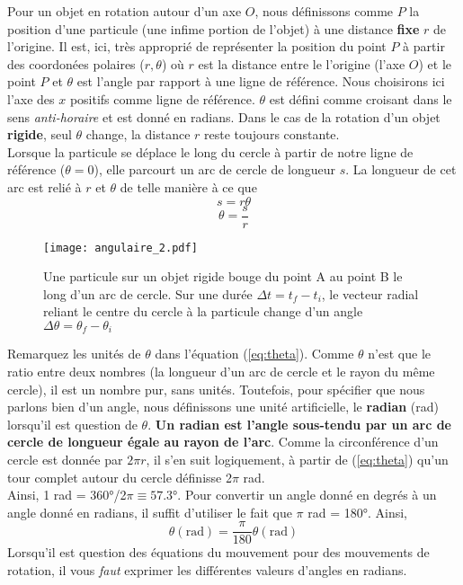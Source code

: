 \documentclass[titlepage,oneside,a4paper,11pt]{book} %
\begin{document}
Pour un objet en rotation autour d'un axe $O$, nous définissons comme $P$ la position d'une particule (une infime portion de l'objet) à une distance \textbf{fixe} $r$ de l'origine. Il est, ici, très approprié de représenter la position du point $P$ à partir des coordonées polaires ($r,\theta$) où $r$ est la distance entre le l'origine (l'axe $O$) et le point $P$ et $\theta$ est l'angle par rapport à une ligne de référence. Nous choisirons ici l'axe des $x$ positifs comme ligne de référence. $\theta$ est défini comme croisant dans le sens \emph{anti-horaire} et est donné en radians. Dans le cas de la rotation d'un objet \textbf{rigide}, seul {}$\theta$ change, la distance $r$ reste toujours constante.\\

Lorsque la particule se déplace le long du cercle à partir de notre ligne de référence ($\theta = 0$), elle parcourt un arc de cercle de longueur $s$. La longueur de cet arc est relié à $r$ et $\theta$ de telle manière à ce que
\begin{equation}
s=r\theta
\end{equation}
\begin{equation}
\theta=\frac{s}{r}
\label{eq:theta}
\end{equation}
\begin{wrapfigure}{r}{0.4\textwidth}
  \begin{center}
    \texttt{[image: angulaire\_2.pdf]}
  \end{center}
  \caption{Une particule sur un objet rigide bouge du point A au point B le long d'un arc de cercle. Sur une durée $\Delta t = t_f-t_i$, le vecteur radial reliant le centre du cercle à la particule change d'un angle $\Delta \theta = \theta_f-\theta_i$}
\end{wrapfigure}
Remarquez les unités de $\theta$ dans l'équation (\ref{eq:theta}). Comme $\theta$ n'est que le ratio entre deux nombres (la longueur d'un arc de cercle et le rayon du même cercle), il est un nombre pur, sans unités.  Toutefois, pour spécifier que nous parlons bien d'un angle, nous définissons une unité artificielle, le \textbf{radian} (rad) lorsqu'il est question de $\theta$. \textbf{Un radian est l'angle sous-tendu par un arc de cercle de longueur égale au rayon de l'arc}. Comme la circonférence d'un cercle est donnée par $2\pi r$, il s'en suit logiquement, à partir de (\ref{eq:theta}) qu'un tour complet autour du cercle définisse 2$\pi$ rad.\\

Ainsi, 1 rad = 360°/2$\pi \equiv 57.3$°. Pour convertir un angle donné en degrés à un angle donné en radians, il suffit d'utiliser le fait que $\pi$ rad = 180°. Ainsi,
\begin{equation*}
\theta (\mathrm{rad}) = \frac{\pi}{180}\theta(\mathrm{rad})
\end{equation*}
Lorsqu'il est question des équations du mouvement pour des mouvements de rotation, il vous \emph{faut} exprimer les différentes valeurs d'angles en radians.\\
\end{document}

